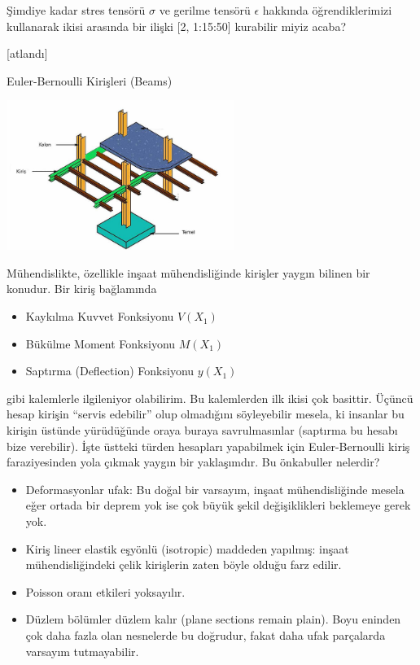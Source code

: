 \documentclass[12pt,fleqn]{article}\usepackage{../../common}
\begin{document}
Şimdiye kadar stres tensörü $\sigma$ ve gerilme tensörü $\epsilon$ hakkında
öğrendiklerimizi kullanarak ikisi arasında bir ilişki [2, 1:15:50] kurabilir
miyiz acaba?

[atlandı]

Euler-Bernoulli Kirişleri (Beams)

\includegraphics[width=20em]{phy_020_strs_02_09.jpg}

Mühendislikte, özellikle inşaat mühendisliğinde kirişler yaygın bilinen
bir konudur. Bir kiriş bağlamında

\begin{itemize}
   \item Kaykılma Kuvvet Fonksiyonu $V(X_1)$
   \item Bükülme Moment Fonksiyonu $M(X_1)$
   \item Saptırma (Deflection) Fonksiyonu $y(X_1)$
\end{itemize}

gibi kalemlerle ilgileniyor olabilirim. Bu kalemlerden ilk ikisi çok basittir.
Üçüncü hesap kirişin ``servis edebilir'' olup olmadığını söyleyebilir mesela, ki
insanlar bu kirişin üstünde yürüdüğünde oraya buraya savrulmasınlar (saptırma bu
hesabı bize verebilir). İşte üstteki türden hesapları yapabilmek için
Euler-Bernoulli kiriş faraziyesinden yola çıkmak yaygın bir yaklaşımdır.  Bu
önkabuller nelerdir?

\begin{itemize}
   \item Deformasyonlar ufak: Bu doğal bir varsayım, inşaat mühendisliğinde
     mesela eğer ortada bir deprem yok ise çok büyük şekil değişiklikleri
     beklemeye gerek yok. 
   \item Kiriş lineer elastik eşyönlü (isotropic) maddeden yapılmış: inşaat
     mühendisliğindeki çelik kirişlerin zaten böyle olduğu farz edilir.
   \item Poisson oranı etkileri yoksayılır.
   \item Düzlem bölümler düzlem kalır (plane sections remain plain). Boyu
     eninden çok daha fazla olan nesnelerde bu doğrudur, fakat daha ufak
     parçalarda varsayım tutmayabilir.
\end{itemize}
\end{document}
